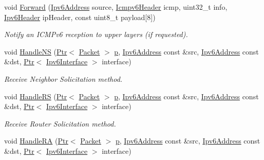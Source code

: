 \begin{DoxyCompactItemize}
\item 
void \hyperlink{classns3_1_1Icmpv6L4Protocol_a0564a55a65b9c577ecf1de0e6893ebc9}{Forward} (\hyperlink{classns3_1_1Ipv6Address}{Ipv6\+Address} source, \hyperlink{classns3_1_1Icmpv6Header}{Icmpv6\+Header} icmp, uint32\+\_\+t info, \hyperlink{classns3_1_1Ipv6Header}{Ipv6\+Header} ip\+Header, const uint8\+\_\+t payload\mbox{[}8\mbox{]})
\begin{DoxyCompactList}\small\item\em Notify an I\+C\+M\+Pv6 reception to upper layers (if requested). \end{DoxyCompactList}\item 
void \hyperlink{classns3_1_1Icmpv6L4Protocol_acec910926a1fdbbea699c10d638aa704}{Handle\+NS} (\hyperlink{classns3_1_1Ptr}{Ptr}$<$ \hyperlink{classns3_1_1Packet}{Packet} $>$ \hyperlink{lte__link__budget__x2__handover__measures_8m_ac9de518908a968428863f829398a4e62}{p}, \hyperlink{classns3_1_1Ipv6Address}{Ipv6\+Address} const \&src, \hyperlink{classns3_1_1Ipv6Address}{Ipv6\+Address} const \&dst, \hyperlink{classns3_1_1Ptr}{Ptr}$<$ \hyperlink{classns3_1_1Ipv6Interface}{Ipv6\+Interface} $>$ interface)
\begin{DoxyCompactList}\small\item\em Receive Neighbor Solicitation method. \end{DoxyCompactList}\item 
void \hyperlink{classns3_1_1Icmpv6L4Protocol_a5ad8cee1b6e1884f9c833fc09ff4f4e8}{Handle\+RS} (\hyperlink{classns3_1_1Ptr}{Ptr}$<$ \hyperlink{classns3_1_1Packet}{Packet} $>$ \hyperlink{lte__link__budget__x2__handover__measures_8m_ac9de518908a968428863f829398a4e62}{p}, \hyperlink{classns3_1_1Ipv6Address}{Ipv6\+Address} const \&src, \hyperlink{classns3_1_1Ipv6Address}{Ipv6\+Address} const \&dst, \hyperlink{classns3_1_1Ptr}{Ptr}$<$ \hyperlink{classns3_1_1Ipv6Interface}{Ipv6\+Interface} $>$ interface)
\begin{DoxyCompactList}\small\item\em Receive Router Solicitation method. \end{DoxyCompactList}\item 
void \hyperlink{classns3_1_1Icmpv6L4Protocol_af1a56b5658c12d34615aa712758359d5}{Handle\+RA} (\hyperlink{classns3_1_1Ptr}{Ptr}$<$ \hyperlink{classns3_1_1Packet}{Packet} $>$ \hyperlink{lte__link__budget__x2__handover__measures_8m_ac9de518908a968428863f829398a4e62}{p}, \hyperlink{classns3_1_1Ipv6Address}{Ipv6\+Address} const \&src, \hyperlink{classns3_1_1Ipv6Address}{Ipv6\+Address} const \&dst, \hyperlink{classns3_1_1Ptr}{Ptr}$<$ \hyperlink{classns3_1_1Ipv6Interface}{Ipv6\+Interface} $>$ interface)

\end{DoxyCompactItemize}
